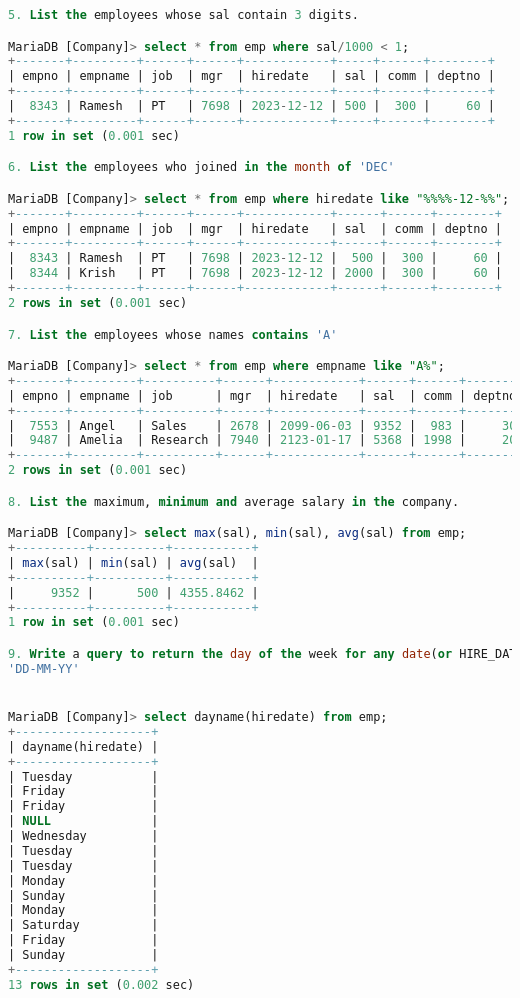 \documentclass[11pt]{article}
\begin{document}
\begin{lstlisting}[language=SQL]
5. List the employees whose sal contain 3 digits.

MariaDB [Company]> select * from emp where sal/1000 < 1;
+-------+---------+------+------+------------+-----+------+--------+
| empno | empname | job  | mgr  | hiredate   | sal | comm | deptno |
+-------+---------+------+------+------------+-----+------+--------+
|  8343 | Ramesh  | PT   | 7698 | 2023-12-12 | 500 |  300 |     60 |
+-------+---------+------+------+------------+-----+------+--------+
1 row in set (0.001 sec)

6. List the employees who joined in the month of 'DEC'

MariaDB [Company]> select * from emp where hiredate like "%%%%-12-%%";
+-------+---------+------+------+------------+------+------+--------+
| empno | empname | job  | mgr  | hiredate   | sal  | comm | deptno |
+-------+---------+------+------+------------+------+------+--------+
|  8343 | Ramesh  | PT   | 7698 | 2023-12-12 |  500 |  300 |     60 |
|  8344 | Krish   | PT   | 7698 | 2023-12-12 | 2000 |  300 |     60 |
+-------+---------+------+------+------------+------+------+--------+
2 rows in set (0.001 sec)

7. List the employees whose names contains 'A'

MariaDB [Company]> select * from emp where empname like "A%";
+-------+---------+----------+------+------------+------+------+--------+
| empno | empname | job      | mgr  | hiredate   | sal  | comm | deptno |
+-------+---------+----------+------+------------+------+------+--------+
|  7553 | Angel   | Sales    | 2678 | 2099-06-03 | 9352 |  983 |     30 |
|  9487 | Amelia  | Research | 7940 | 2123-01-17 | 5368 | 1998 |     20 |
+-------+---------+----------+------+------------+------+------+--------+
2 rows in set (0.001 sec)

8. List the maximum, minimum and average salary in the company.

MariaDB [Company]> select max(sal), min(sal), avg(sal) from emp;
+----------+----------+-----------+
| max(sal) | min(sal) | avg(sal)  |
+----------+----------+-----------+
|     9352 |      500 | 4355.8462 |
+----------+----------+-----------+
1 row in set (0.001 sec)

9. Write a query to return the day of the week for any date(or HIRE_DATE) entered in format
'DD-MM-YY'


MariaDB [Company]> select dayname(hiredate) from emp;
+-------------------+
| dayname(hiredate) |
+-------------------+
| Tuesday           |
| Friday            |
| Friday            |
| NULL              |
| Wednesday         |
| Tuesday           |
| Tuesday           |
| Monday            |
| Sunday            |
| Monday            |
| Saturday          |
| Friday            |
| Sunday            |
+-------------------+
13 rows in set (0.002 sec)


\end{lstlisting}
\end{document}
